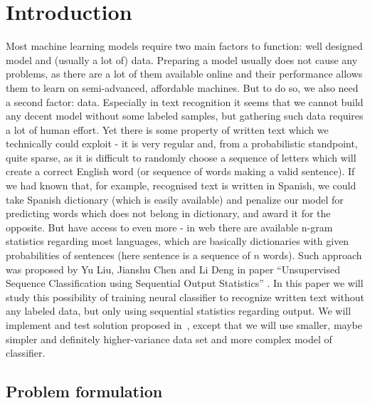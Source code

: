 \documentclass[shortabstract,lic,english]{iithesis}
\author         {Grzegorz Ciesielski}
\date          {}                     %
\begin{document}

\chapter{Introduction}

Most machine learning models require two main factors to function: well 
designed model and (usually a lot of) data. Preparing a model usually does not
cause any problems, as there are a lot of them available online and their performance
allows them to learn on semi-advanced, affordable machines. But to do so,
we also need a second factor: data. Especially in text recognition 
it seems that we cannot build any decent model without some labeled samples, but
gathering such data requires a lot of human effort. Yet there is some property of written
text which we technically could exploit - it is very regular and, from a probabilistic 
standpoint, quite sparse, as it is difficult to randomly choose a sequence of letters which 
will create a correct English word (or sequence of words making a valid sentence).
If we had known that, for example, recognised text is written in Spanish, we could
take Spanish dictionary (which is easily available) and penalize our model for predicting
words which does not belong in dictionary, and award it for the opposite. But have access 
to even more - in web there are available n-gram statistics regarding most languages, which
are basically dictionaries with given probabilities of sentences (here sentence is a
sequence of $n$ words). Such approach was proposed by Yu Liu, Jianshu Chen and Li Deng in paper
``Unsupervised Sequence Classification using Sequential Output Statistics'' \citep{liu2017unsupervised}. 
In this paper we will study this possibility of training neural classifier to recognize 
written text without any labeled data, but only using sequential statistics regarding output.
We will implement and test solution proposed in~\citep{liu2017unsupervised}, 
except that we will use smaller, maybe simpler and definitely higher-variance data set and more 
complex model of classifier.

\section{Problem formulation}
\end{document}

